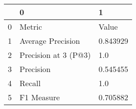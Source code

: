 \begin{tabular}{lll}
\toprule
{} &                     0 &         1 \\
\midrule
0 &                Metric &     Value \\
1 &     Average Precision &  0.843929 \\
2 &  Precision at 3 (P@3) &       1.0 \\
3 &             Precision &  0.545455 \\
4 &                Recall &       1.0 \\
5 &            F1 Measure &  0.705882 \\
\bottomrule
\end{tabular}
